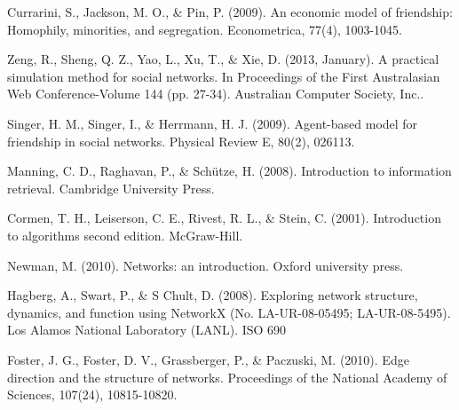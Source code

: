 \documentclass[a4paper,12pt]{article}
\begin{document}
\begin{thebibliography}{9}
  Currarini, S., Jackson, M. O., \& Pin, P. (2009). An economic model of friendship: Homophily, minorities, and segregation. Econometrica, 77(4), 1003-1045.
  
  Zeng, R., Sheng, Q. Z., Yao, L., Xu, T., \& Xie, D. (2013, January). A practical simulation method for social networks. In Proceedings of the First Australasian Web Conference-Volume 144 (pp. 27-34). Australian Computer Society, Inc..
  
  Singer, H. M., Singer, I., \& Herrmann, H. J. (2009). Agent-based model for friendship in social networks. Physical Review E, 80(2), 026113.

  Manning, C. D., Raghavan, P., \& Schütze, H. (2008). Introduction to information retrieval. Cambridge University Press.
  
  Cormen, T. H., Leiserson, C. E., Rivest, R. L., \& Stein, C. (2001). Introduction to algorithms second edition. McGraw-Hill.
  
  Newman, M. (2010). Networks: an introduction. Oxford university press.
  
  Hagberg, A., Swart, P., \& S Chult, D. (2008). Exploring network structure, dynamics, and function using NetworkX (No. LA-UR-08-05495; LA-UR-08-5495). Los Alamos National Laboratory (LANL).
ISO 690	

  Foster, J. G., Foster, D. V., Grassberger, P., \& Paczuski, M. (2010). Edge direction and the structure of networks. Proceedings of the National Academy of Sciences, 107(24), 10815-10820.
\end{thebibliography}
\end{document}
